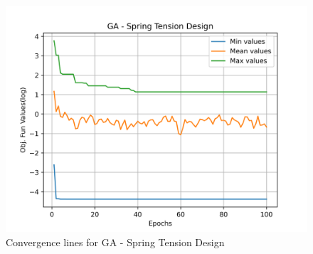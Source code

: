 \begin{figure}[H]
        \centering
        \caption{Convergence lines for GA - Spring Tension Design}
        \label{fig:spring_problem_solve_ga}
        \includegraphics[scale=0.5]{images/spring_problem_solve_ga.png}
        \end{figure}
        